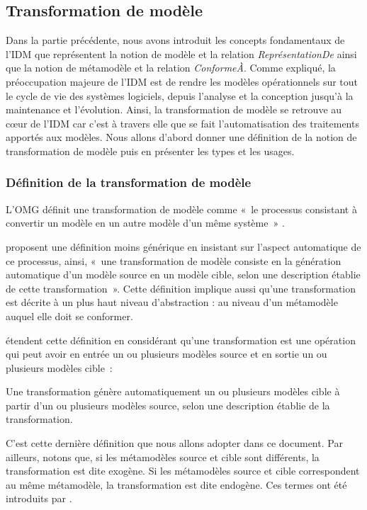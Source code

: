\subsection{Transformation de modèle}
Dans la partie précédente, nous avons introduit les concepts fondamentaux de 
l'IDM que représentent la notion de modèle et la relation 
\textit{ReprésentationDe} ainsi que la notion de métamodèle et la relation 
\textit{ConformeÀ}. Comme expliqué, la préoccupation majeure de l'IDM est de 
rendre les modèles opérationnels sur tout le cycle de vie des systèmes 
logiciels, depuis l'analyse et la conception jusqu'à la maintenance et 
l'évolution. Ainsi, la transformation de modèle se retrouve au cœur de l'IDM car 
c'est à travers elle que se fait l'automatisation des traitements apportés aux 
modèles. Nous allons d'abord donner une définition de la notion de 
transformation de modèle puis en présenter les types et les usages.

\subsubsection{Définition de la transformation de modèle}
L'OMG définit une transformation de modèle comme «~le processus consistant à 
convertir un modèle en un autre modèle d'un même système~» \cite{omg2011meta}. 

\cite{kleppe2003mda} proposent une définition moins générique en insistant sur 
l'aspect automatique de ce processus, ainsi, «~une transformation de modèle 
consiste en la génération automatique d'un modèle source en un modèle cible, 
selon une description établie de cette transformation~». Cette définition 
implique aussi qu'une transformation est décrite à un plus haut niveau 
d'abstraction : au niveau d'un métamodèle auquel elle doit se conformer. 

\cite{mens2006taxonomy} étendent cette définition en considérant qu'une 
transformation est une opération qui peut avoir en entrée un ou plusieurs 
modèles source et en sortie un ou plusieurs modèles cible~: 

\begin{definition}
Une transformation génère automatiquement un ou plusieurs modèles cible à partir 
d'un ou plusieurs modèles source, selon une description établie de la 
transformation. 
\end{definition}

C'est cette dernière définition que nous allons adopter dans ce document. Par 
ailleurs, notons que, si les métamodèles source et cible sont différents, la 
transformation est dite exogène. Si les métamodèles source et cible 
correspondent au même métamodèle, la transformation est dite endogène. Ces 
termes ont été introduits par \cite{mens2006taxonomy}.

